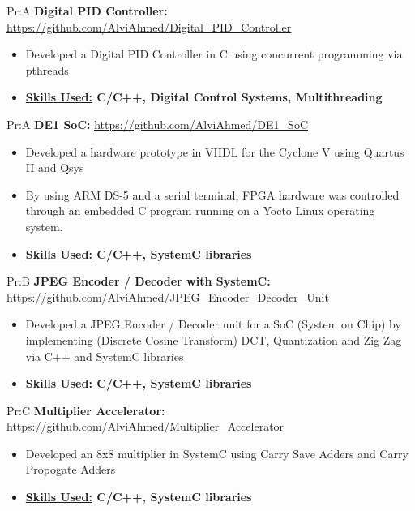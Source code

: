 

Pr:A
\vspace{\spaces}
\textbf{Digital PID Controller: }
\underline{\url{https://github.com/AlviAhmed/Digital_PID_Controller}}
\begin{itemize}[noitemsep,nolistsep]
\item Developed a Digital PID Controller in C using concurrent programming via pthreads
\item \textbf{ \underline{Skills Used:} C/C++, Digital Control Systems, Multithreading}
\end{itemize} 

 
Pr:A
\vspace{\spaces}
\textbf{DE1 SoC: }
\underline{\url{https://github.com/AlviAhmed/DE1_SoC}}
\begin{itemize}[noitemsep,nolistsep]
\item Developed a hardware prototype in VHDL for the Cyclone V using Quartus II and Qsys
\item By using ARM DS-5 and a serial terminal, FPGA hardware was controlled through an embedded C program running on a Yocto Linux operating system.
\item \textbf{\underline{Skills Used:} C/C++, SystemC libraries}
\end{itemize} 

 
Pr:B
\vspace{\spaces}
\textbf{JPEG Encoder / Decoder with SystemC: }
\underline{\url{https://github.com/AlviAhmed/JPEG_Encoder_Decoder_Unit}}
\begin{itemize}[noitemsep,nolistsep]
\item Developed a JPEG Encoder / Decoder unit for a SoC (System on Chip) by implementing
  (Discrete Cosine Transform) DCT, Quantization and Zig Zag via C++ and SystemC libraries
\item \textbf{\underline{Skills Used:} C/C++, SystemC libraries}
\end{itemize} 

 
Pr:C
\vspace{\spaces}
\textbf{Multiplier Accelerator: }
\underline{\url{https://github.com/AlviAhmed/Multiplier_Accelerator}}
\begin{itemize}[noitemsep,nolistsep]
\item Developed an 8x8 multiplier in SystemC using Carry Save Adders and Carry Propogate Adders
\item \textbf{\underline{Skills Used:} C/C++, SystemC libraries}
\end{itemize} 

